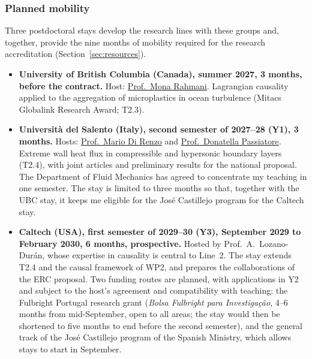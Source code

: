 \documentclass[11pt]{article}
\begin{document}
\subsubsection*{Planned mobility}
Three postdoctoral stays develop the research lines with these groups and, together, provide the
nine months of mobility required for the research accreditation (Section~\ref{sec:resources}).
\begin{itemize}
  \item \textbf{University of British Columbia (Canada), summer 2027, 3 months, before the
  contract.} Host: \href{https://chbe.ubc.ca/mona-rahmani/}{Prof.\ Mona Rahmani}. Lagrangian
  causality applied to the aggregation of microplastics in ocean turbulence (Mitacs Globalink
  Research Award; T2.3).
  
  \item \textbf{Universit\`a del Salento (Italy), second semester of 2027--28 (Y1), 3 months.} Hosts:
  \href{https://www.unisalento.it/scheda-utente/-/people/mario.direnzo}{Prof.\ Mario Di Renzo}
  and \href{https://www.unisalento.it/scheda-utente/-/people/donatella.passiatore}{Prof.\
  Donatella Passiatore}. Extreme wall heat flux in compressible and hypersonic boundary layers (T2.4), with
  joint articles and preliminary results for the national proposal. The Department of Fluid
  Mechanics has agreed to concentrate my teaching in one semester. The stay is limited to
  three months so that, together with the UBC stay, it keeps me eligible for the José
  Castillejo program for the Caltech stay.
  
  \item \textbf{Caltech (USA), first semester of 2029--30 (Y3), September 2029 to February 2030, 6 months,
  prospective.} Hosted by Prof.\ A.\ Lozano-Dur\'an, whose expertise in causality is central to Line~2. The stay extends T2.4 and the causal framework of WP2, and prepares the collaborations of the ERC proposal. Two funding routes are planned,
  with applications in Y2 and subject to the host's agreement and compatibility with
  teaching: the Fulbright Portugal research grant (\emph{Bolsa Fulbright para
  Investiga\c{c}\~ao}, 4--6 months from mid-September, open to all areas; the stay would then be
  shortened to five months to end before the second semester), and the general track of the José
  Castillejo program of the Spanish Ministry, which allows stays to start in September.
\end{itemize}
\end{document}
